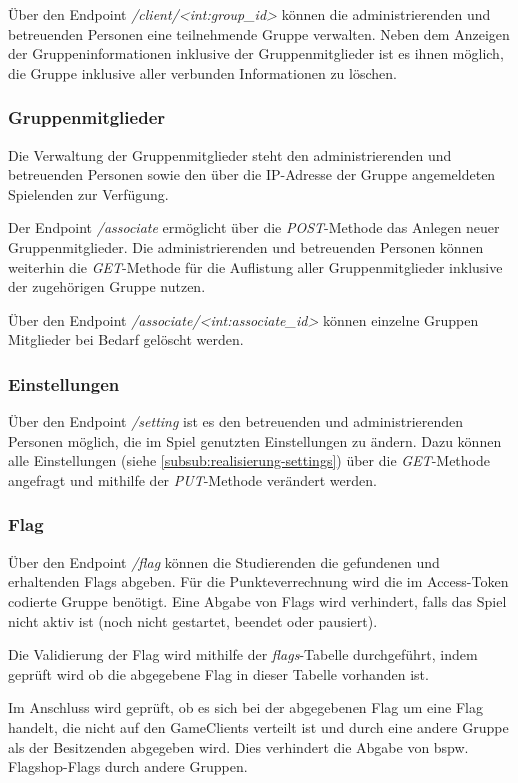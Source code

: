 Über den Endpoint \textit{/client/<int:group\_id>} können die administrierenden und betreuenden Personen eine teilnehmende Gruppe verwalten. Neben dem Anzeigen der Gruppeninformationen inklusive der Gruppenmitglieder ist es ihnen möglich, die Gruppe inklusive aller verbunden Informationen zu löschen.

\subsubsection{Gruppenmitglieder}
Die Verwaltung der Gruppenmitglieder steht den administrierenden und betreuenden Personen sowie den über die IP-Adresse der Gruppe angemeldeten Spielenden zur Verfügung.

Der Endpoint \textit{/associate} ermöglicht über die \textit{POST}-Methode das Anlegen neuer Gruppenmitglieder. Die administrierenden und betreuenden Personen können weiterhin die \textit{GET}-Methode für die Auflistung aller Gruppenmitglieder inklusive der zugehörigen Gruppe nutzen.

Über den Endpoint \textit{/associate/<int:associate\_id>} können einzelne Gruppen Mitglieder bei Bedarf gelöscht werden.

\subsubsection{Einstellungen}
Über den Endpoint \textit{/setting} ist es den betreuenden und administrierenden Personen möglich, die im Spiel genutzten Einstellungen zu ändern. Dazu können alle Einstellungen (siehe \autoref{subsub:realisierung-settings}) über die \textit{GET}-Methode angefragt und mithilfe der \textit{PUT}-Methode verändert werden.

\subsubsection{Flag}
Über den Endpoint \textit{/flag} können die Studierenden die gefundenen und erhaltenden Flags abgeben. Für die Punkteverrechnung wird die im Access-Token codierte Gruppe benötigt. Eine Abgabe von Flags wird verhindert, falls das Spiel nicht aktiv ist (noch nicht gestartet, beendet oder pausiert).

Die Validierung der Flag wird mithilfe der \textit{flags}-Tabelle durchgeführt, indem geprüft wird ob die abgegebene Flag in dieser Tabelle vorhanden ist.

Im Anschluss wird geprüft, ob es sich bei der abgegebenen Flag um eine Flag handelt, die nicht auf den GameClients verteilt ist und durch eine andere Gruppe als der Besitzenden abgegeben wird. Dies verhindert die Abgabe von bspw. Flagshop-Flags durch andere Gruppen. 

